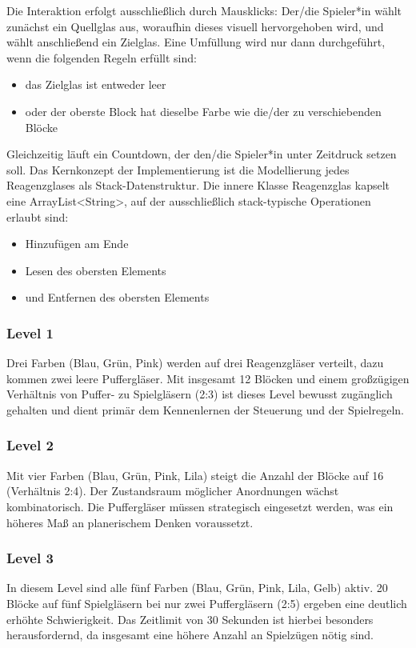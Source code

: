 Die Interaktion erfolgt ausschließlich durch Mausklicks: Der/die Spieler*in wählt zunächst ein \glqq{}Quellglas\grqq{} aus, woraufhin dieses visuell hervorgehoben wird, und wählt anschließend ein Zielglas.
Eine Umfüllung wird nur dann durchgeführt, wenn die folgenden Regeln erfüllt sind:
\begin{itemize}
\item das Zielglas ist entweder leer
\item oder der oberste Block hat dieselbe Farbe wie die/der zu verschiebenden Blöcke
\end{itemize}

Gleichzeitig läuft ein Countdown, der den/die Spieler*in unter Zeitdruck setzen soll.
Das Kernkonzept der Implementierung ist die Modellierung jedes Reagenzglases als Stack-Datenstruktur. Die innere Klasse Reagenzglas kapselt eine ArrayList<String>, auf der ausschließlich stack-typische Operationen erlaubt sind:
\begin{itemize}
\item Hinzufügen am Ende
\item Lesen des obersten Elements
\item und Entfernen des obersten Elements
\end{itemize}

\subsubsection{Level 1}

Drei Farben (Blau, Grün, Pink) werden auf drei Reagenzgläser verteilt, dazu kommen zwei leere Puffergläser. Mit insgesamt 12 Blöcken und einem großzügigen Verhältnis von Puffer- zu Spielgläsern (2:3) ist dieses Level bewusst zugänglich gehalten und dient primär dem Kennenlernen der Steuerung und der Spielregeln.

\subsubsection{Level 2}
Mit vier Farben (Blau, Grün, Pink, Lila) steigt die Anzahl der Blöcke auf 16 (Verhältnis 2:4). Der Zustandsraum möglicher Anordnungen wächst kombinatorisch. Die Puffergläser müssen strategisch eingesetzt werden, was ein höheres Maß an planerischem Denken voraussetzt.

\subsubsection{Level 3}
In diesem Level sind alle fünf Farben (Blau, Grün, Pink, Lila, Gelb) aktiv. 20 Blöcke auf fünf Spielgläsern bei nur zwei Puffergläsern (2:5) ergeben eine deutlich erhöhte Schwierigkeit. Das Zeitlimit von 30 Sekunden ist hierbei besonders herausfordernd, da insgesamt eine höhere Anzahl an Spielzügen nötig sind.

